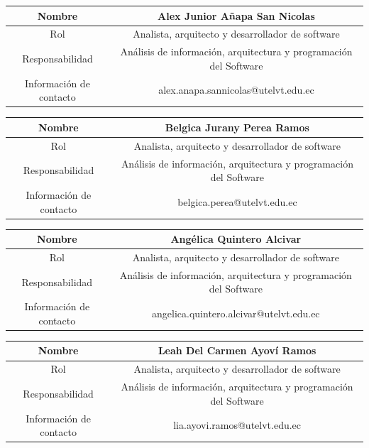 \documentclass[11pt]{article}
\begin{document}
\vspace{10pt}

\begin{tabular}{|c|c|}

\hline
Nombre & Alex Junior Añapa San Nicolas  \\
\hline
Rol & Analista, arquitecto y desarrollador de software \\
\hline
Responsabilidad & Análisis de información, arquitectura y programación del Software  \\
\hline
Información de contacto & alex.anapa.sannicolas@utelvt.edu.ec \\
\hline

\end{tabular}
\vspace{10pt}

\begin{tabular}{|c|c|}

\hline
Nombre & Belgica Jurany Perea Ramos  \\
\hline
Rol & Analista, arquitecto y desarrollador de software \\
\hline
Responsabilidad & Análisis de información, arquitectura y programación del Software  \\
\hline
Información de contacto & belgica.perea@utelvt.edu.ec \\
\hline

\end{tabular}
\vspace{10pt}

\begin{tabular}{|c|c|}

\hline
Nombre & Angélica Quintero Alcivar  \\
\hline
Rol & Analista, arquitecto y desarrollador de software \\
\hline
Responsabilidad & Análisis de información, arquitectura y programación del Software  \\
\hline
Información de contacto & angelica.quintero.alcivar@utelvt.edu.ec \\
\hline

\end{tabular}
\vspace{10pt}

\begin{tabular}{|c|c|}

\hline
Nombre & Leah Del Carmen Ayoví Ramos \\
\hline
Rol & Analista, arquitecto y desarrollador de software \\
\hline
Responsabilidad & Análisis de información, arquitectura y programación del Software  \\
\hline
Información de contacto & lia.ayovi.ramos@utelvt.edu.ec \\
\hline

\end{tabular}
\vspace{10pt}
\end{document}

